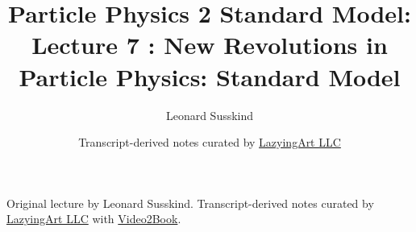 \documentclass[11pt,oneside]{book}
\begin{document}
\frontmatter
\title{Particle Physics 2 Standard Model: Lecture 7 : New Revolutions in Particle Physics: Standard Model}
\author{Leonard Susskind}
\date{Transcript-derived notes curated by \href{https://lazying.art}{LazyingArt LLC}}
\maketitle
\begin{center}
\small Original lecture by Leonard Susskind. Transcript-derived notes curated by \href{https://lazying.art}{LazyingArt LLC} with \href{https://github.com/lachlanchen/Video2Book}{Video2Book}.
\end{center}
\clearpage
\mainmatter

\end{document}
